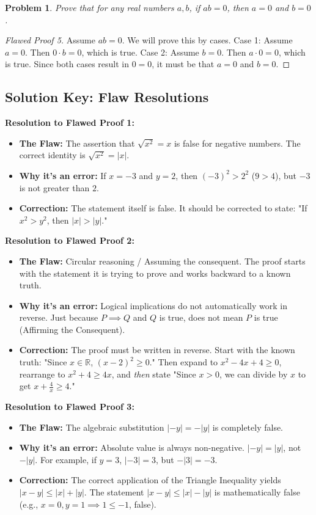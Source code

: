 \documentclass[11pt]{article}
\newtheorem{problem}{Problem}
\newcommand{\R}{\mathbb{R}}
\newcommand{\abs}[1]{\left|#1\right|}
\begin{document}
\begin{problem}
Prove that for any real numbers $a, b$, if $ab = 0$, then $a = 0$ and $b = 0$.
\end{problem}
\begin{proof}[Flawed Proof 5]
Assume $ab = 0$. We will prove this by cases.
Case 1: Assume $a = 0$. Then $0 \cdot b = 0$, which is true.
Case 2: Assume $b = 0$. Then $a \cdot 0 = 0$, which is true.
Since both cases result in $0 = 0$, it must be that $a = 0$ and $b = 0$.
\end{proof}

\newpage
\subsection{Solution Key: Flaw Resolutions}

\textbf{Resolution to Flawed Proof 1:}
\begin{itemize}
    \item \textbf{The Flaw:} The assertion that $\sqrt{x^2} = x$ is false for negative numbers. The correct identity is $\sqrt{x^2} = \abs{x}$.
    \item \textbf{Why it's an error:} If $x = -3$ and $y = 2$, then $(-3)^2 > 2^2$ ($9 > 4$), but $-3$ is not greater than $2$.
    \item \textbf{Correction:} The statement itself is false. It should be corrected to state: "If $x^2 > y^2$, then $\abs{x} > \abs{y}$."
\end{itemize}

\textbf{Resolution to Flawed Proof 2:}
\begin{itemize}
    \item \textbf{The Flaw:} Circular reasoning / Assuming the consequent. The proof starts with the statement it is trying to prove and works backward to a known truth.
    \item \textbf{Why it's an error:} Logical implications do not automatically work in reverse. Just because $P \implies Q$ and $Q$ is true, does not mean $P$ is true (Affirming the Consequent).
    \item \textbf{Correction:} The proof must be written in reverse. Start with the known truth: "Since $x \in \R$, $(x-2)^2 \ge 0$." Then expand to $x^2 - 4x + 4 \ge 0$, rearrange to $x^2 + 4 \ge 4x$, and \textit{then} state "Since $x > 0$, we can divide by $x$ to get $x + \frac{4}{x} \ge 4$."
\end{itemize}

\textbf{Resolution to Flawed Proof 3:}
\begin{itemize}
    \item \textbf{The Flaw:} The algebraic substitution $\abs{-y} = -\abs{y}$ is completely false.
    \item \textbf{Why it's an error:} Absolute value is always non-negative. $\abs{-y} = \abs{y}$, not $-\abs{y}$. For example, if $y = 3$, $\abs{-3} = 3$, but $-\abs{3} = -3$.
    \item \textbf{Correction:} The correct application of the Triangle Inequality yields $\abs{x - y} \le \abs{x} + \abs{y}$. The statement $\abs{x - y} \le \abs{x} - \abs{y}$ is mathematically false (e.g., $x=0, y=1 \implies 1 \le -1$, false).
\end{itemize}
\end{document}
